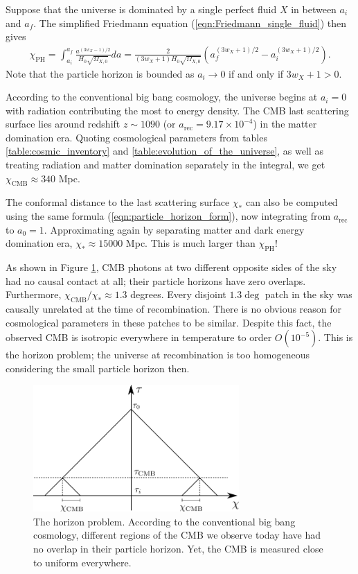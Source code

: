 Suppose that the universe is dominated by a single perfect fluid $X$ in between $a_i$ and $a_f$. The simplified Friedmann equation (\ref{eqn:Friedmann_single_fluid}) then gives
\begin{align}
	\chi_\text{PH} = \int_{a_i}^{a_f} \frac{a^{(3w_X - 1)/2}}{H_0 \sqrt{\Omega_{X,0}}} da = \frac{2}{(3w_X+1) H_0 \sqrt{\Omega_{X,0}}} \left( a_f^{(3w_X+1)/2} - a_i^{(3w_X+1)/2} \right). \label{eqn:particle_horizon_form}
\end{align}
Note that the particle horizon is bounded as $a_i \rightarrow 0$ if and only if $3w_X+1>0$.

According to the conventional big bang cosmology, the universe begins at $a_i=0$ with radiation contributing the most to energy density. The CMB last scattering surface lies around redshift $z \sim 1090$ (or $a_\text{rec}=9.17\times 10^{-4}$) in the matter domination era. Quoting cosmological parameters from tables \ref{table:cosmic_inventory} and \ref{table:evolution_of_the_universe}, as well as treating radiation and matter domination separately in the integral, we get $\chi_\text{CMB} \approx 340$ Mpc.

The conformal distance to the last scattering surface $\chi_*$ can also be computed using the same formula (\ref{eqn:particle_horizon_form}), now integrating from $a_\text{rec}$ to $a_0=1$. Approximating again by separating matter and dark energy domination era, $\chi_* \approx 15000$ Mpc. This is much larger than $\chi_\text{PH}$!

As shown in Figure \ref{fig:horizon_problem}, CMB photons at two different opposite sides of the sky had no causal contact at all; their particle horizons have zero overlaps. Furthermore, $\chi_\text{CMB}/\chi_* \approx 1.3$ degrees. Every disjoint $1.3\deg$ patch in the sky was causally unrelated at the time of recombination. There is no obvious reason for cosmological parameters in these patches to be similar. Despite this fact, the observed CMB is isotropic everywhere in temperature to order $O(10^{-5})$. This is the horizon problem; the universe at recombination is too homogeneous considering the small particle horizon then.
\begin{figure}[htbp!] 
	\centering    
	\includegraphics[width=0.7\textwidth]{horizon_problem.png}
	\caption{The horizon problem. According to the conventional big bang cosmology, different regions of the CMB we observe today have had no overlap in their particle horizon. Yet, the CMB is measured close to uniform everywhere.}
	\label{fig:horizon_problem}
\end{figure}

